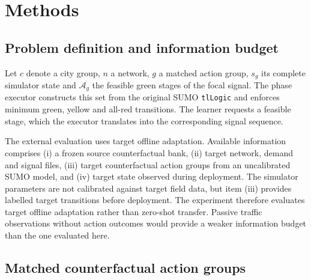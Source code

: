 \section{Methods}

\subsection{Problem definition and information budget}

Let $c$ denote a city group, $n$ a network, $g$ a matched action group,
$s_g$ its complete simulator state and $\mathcal{A}_g$ the feasible green
stages of the focal signal.  The phase executor constructs this set from
the original SUMO \texttt{tlLogic} and enforces minimum green, yellow and
all-red transitions.  The learner requests a feasible stage, which the
executor translates into the corresponding signal sequence.

The external evaluation uses target offline adaptation.  Available
information comprises (i) a frozen source counterfactual bank, (ii) target
network, demand and signal files, (iii) target counterfactual action groups
from an uncalibrated SUMO model, and (iv) target state observed during
deployment.  The simulator parameters are not calibrated against target field
data, but item (iii) provides labelled target transitions before deployment.
The experiment therefore evaluates target offline adaptation rather than
zero-shot transfer.  Passive traffic observations without action outcomes
would provide a weaker information budget than the one evaluated here.

\subsection{Matched counterfactual action groups}
\label{sec:methods-matched-groups}

